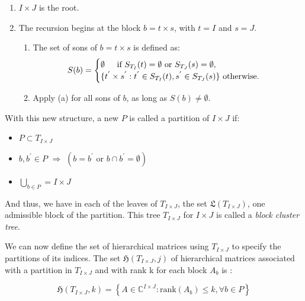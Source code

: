 \begin{enumerate}
    \item $I \times J$ is the root.
    \item The recursion begins at the block $b = t \times s$, with $t = I$ and $s = J$.
          \begin{enumerate}
              \item The set of sons of $b = t \times s$ is defined as:
                    $$
                        S(b) =
                        \begin{cases}
                            \emptyset \hspace{4mm} \text{ if } S_{T_{I}}(t) = \emptyset \text{ or } S_{T_{J}}(s)=\emptyset, \\
                            \{t^{'}\times s^{'}:t^{'}\in S_{T_{I}}(t), s^{'}\in S_{T_{J}}(s)\}  \text{ otherwise.}
                        \end{cases}
                    $$
              \item Apply (a) for all sons of $b$, as long as $S(b) \neq \emptyset$.
          \end{enumerate}
\end{enumerate}

With this new structure, a new $P$ is called a partition of $I \times J$ if:

\begin{itemize}
    \item $P \subset T_{I \times J}$
    \item $b, b^{'} \in P$ \hspace{1mm} $\Rightarrow$ \hspace{1mm} $(b=b^{'} \text{ or }b\cap b^{'}=\emptyset )$
    \item $\bigcup_{b\in P} = I \times J$
\end{itemize}

And thus, we have in each of the leaves of $T_{I \times J}$, the set $\mathfrak{L}(T_{I \times J})$, one admissible block of the partition. This tree $T_{I \times J}$ for $I \times J$ is called a \textit{block cluster tree}.


We can now define the set of hierarchical matrices using $T_{I \times J}$ to specify the partitions of its indices. The set $\mathfrak{H}(T_{I \times J},j)$ of hierarchical matrices associated with a partition in $T_{I \times J}$ and with rank k for each block $A_{b}$ is :

\begin{equation}\label{eq:matrix_hier}
    \mathfrak{H}(T_{I \times J},k) = \left\{  A\in \mathbb{C}^{I\times J} : \text{rank}(A_{b}) \leq k, \forall b \in P \right\}
\end{equation}

